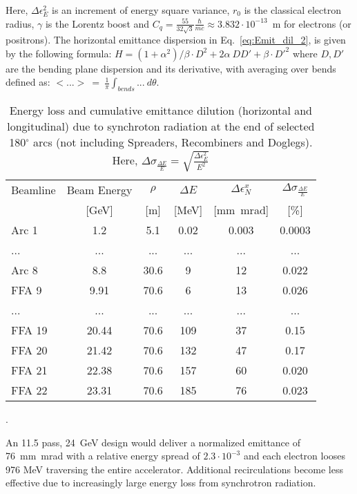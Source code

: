 Here, $\Delta \epsilon^2_E$ is an increment of energy square variance, $r_0$ is the classical electron radius, $\gamma$ is the Lorentz boost and $C_q = \frac{55}{32 \sqrt{3}} \frac{\hbar}{m c} \approx 3.832 \cdot 10^{-13}$~m for electrons (or positrons).
The horizontal emittance dispersion in Eq.~\ref{eq:Emit_dil_2},  is given by the following formula: $H = (1+\alpha^2)/\beta \cdot D^2 + 2 \alpha \ D D' + \beta \cdot D'^2$ where $D, D'$ are the bending plane dispersion and its derivative, with averaging over bends defined as: $<...>~=~\frac{1}{\pi}\int_{bends}...~d\theta$.
%
\begin{table}[!hbt]
  \centering
  \small
  \begin{tabular}{lccccc} 
  \hline
  Beamline & Beam Energy & $\rho$ & $\Delta E$  & $\Delta \epsilon^x_N$ & $\Delta \sigma_{\frac{\Delta E}{E}}$  \\
    & [GeV] & [m] & [MeV]&  [mm~mrad] &  [\%]\\
  \hline\hline
  Arc 1 & 1.2 & 5.1 & 0.02 & 0.003 & 0.0003\\
  ... & ... & ... & ... & ... & ...\\
  Arc 8 & 8.8 & 30.6 & 9 & 12 & 0.022\\
  FFA 9 & 9.91 & 70.6 & 6 & 13 & 0.026\\
  ... & ... & ... & ... & ... & ...\\
  FFA 19 & 20.44 & 70.6 & 109 & 37 & 0.15\\
  FFA 20 & 21.42 & 70.6 & 132 & 47 & 0.17\\
  FFA 21 & 22.38 & 70.6 & 157 & 60 & 0.020\\
  FFA 22 & 23.31 & 70.6 & 185 & 76 & 0.023\\
  \hline
  \end{tabular}
  \caption{Energy loss and cumulative emittance dilution (horizontal and longitudinal) due to synchroton radiation at the end of selected  180$^{\circ}$ arcs (not including Spreaders, Recombiners and Doglegs). Here, $\Delta \sigma_{\frac{\Delta E}{E}} = \sqrt{\frac{\Delta \epsilon_E^2}{E^2}}$}.
  \label{tab:SREmittance}
\end{table}
An 11.5 pass, 24~GeV design would deliver a normalized emittance of  \SI{76}{mm~mrad} with a relative energy spread of $2.3 \cdot 10^{-3}$ and each electron looses 976 MeV traversing the entire accelerator. Additional recirculations become less effective due to increasingly large energy loss from synchrotron radiation.
%
